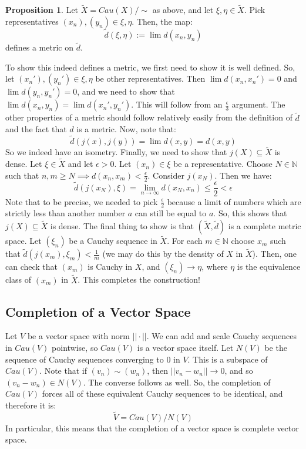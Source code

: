 \documentclass[11pt, oneside]{amsart}   	%
\theoremstyle{definition}
\newtheorem{prop}{Proposition}[section]
\begin{document}
	\begin{prop}
		Let $\tilde X = Cau(X)/\sim$ as above, and let $\xi, \eta\in \tilde X$. Pick representatives $(x_n), (y_n)\in\xi, \eta$. Then, the map:
		$$
			\tilde d(\xi, \eta) := \lim d(x_n, y_n)
		$$
		defines a metric on $\tilde d$.
	\end{prop}
	
	To show this indeed defines a metric, we first need to show it is well defined. So, let $(x_n'), (y_n')\in\xi, \eta$ be other representatives. Then $\lim d(x_n, x_n') 
	= 0$ and $\lim d(y_n, y_n') = 0$, and we need to show that $\lim d(x_n, y_n) = \lim d(x_n', y_n')$. This will follow from an $\frac{\epsilon}{3}$ argument. The 
	other properties of a metric should follow relatively easily from the definition of $\tilde d$ and the fact that $d$ is a metric. Now, 
	note that:
	$$
		\tilde d(j(x), j(y)) = \lim d(x, y) = d(x, y)
	$$
	So we indeed have an isometry. Finally, we need to show that $j(X)\subseteq\tilde X$ is dense. Let $\xi\in\tilde X$ and let $\epsilon > 0$. Let $(x_n)\in\xi$ be a 
	representative. Choose $N\in\mathbb N$ such that $n, m\geq N\implies d(x_n, x_m) < \frac{\epsilon}{2}$. Consider $j(x_N)$. Then we have:
	$$
		\tilde d(j(x_N), \xi) = \lim_{n\rightarrow\infty} d(x_N, x_n) \leq \frac{\epsilon}{2} < \epsilon
	$$
	Note that to be precise, we needed to pick $\frac{\epsilon}{2}$ because a limit of numbers which are strictly less than another number $a$ can still be equal to 
	$a$. So, this shows that $j(X)\subseteq\tilde X$ is dense. The final thing to show is that $(\tilde X, \tilde d)$ is a complete metric space. Let $(\xi_n)$ be a 
	Cauchy sequence in $\tilde X$. For each $m\in\mathbb N$ choose $x_m$ such that $\tilde d(j(x_m), \xi_m) < \frac{1}{m}$ (we may do this by the density of $X$ 
	in $\tilde X$). Then, one can check that $(x_m)$ is Cauchy in $X$, and $(\xi_n)\rightarrow\eta$, where $\eta$ is the equivalence class of $(x_m)$ in $\tilde X$.
	This completes the construction!
	
	\subsection{Completion of a Vector Space}
	
	Let $V$ be a vector space with norm $||\cdot||$. We can add and scale Cauchy sequences in $Cau(V)$ pointwise, so $Cau(V)$ is a vector space itself. 
	Let $N(V)$ be the sequence of Cauchy sequences converging to $0$ in $V$. This is a subspace of $Cau(V)$. Note that if $(v_n)\sim (w_n)$, then $||v_n - 
	w_n||\rightarrow 0$, and so $(v_n - w_n)\in N(V)$. The converse follows as well. So, the completion of $Cau(V)$ forces all of these equivalent Cauchy 
	sequences to be identical, and therefore it is:
	$$
		\tilde V = Cau(V) / N(V)
	$$
	In particular, this means that the completion of a vector space is complete vector space.
	
\end{document}
